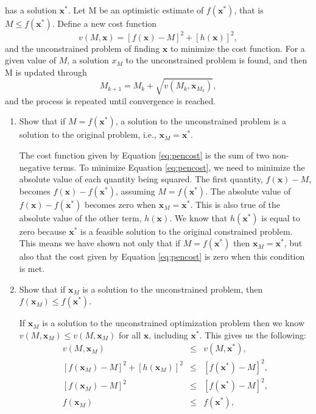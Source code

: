 \documentclass{article}
\begin{document}
has a solution $\mathbf{x}^*$.
Let M be an optimistic estimate of $f(\mathbf{x}^*)$, that is $M \le f(\mathbf{x}^*)$.
Define a new cost function
\begin{equation} \label{eq:pencost}
v(M,\mathbf{x}) = \left[f(\mathbf{x})-M\right]^2 + [h(\mathbf{x})]^2,
\end{equation}
and the unconstrained problem of finding $\mathbf{x}$ to minimize the cost function.
For a given value of $M$, a solution $x_M$ to the unconstrained problem is found, and then M is updated through
\begin{equation} \label{eq:penupdate}
M_{k+1} = M_k + \sqrt{v(M_k,\mathbf{x}_{M_k})},
\end{equation}
and the process is repeated until convergence is reached.

\begin{enumerate}
	\item \label{step:opt} Show that if $M=f(\mathbf{x}^*)$, a solution to the unconstrained problem is a solution to the original problem, i.e., $\mathbf{x}_M = \mathbf{x}^*$.
	
	The cost function given by Equation \ref{eq:pencost} is the sum of two non-negative terms.
	To minimize Equation \ref{eq:pencost}, we need to minimize the absolute value of each quantity being squared.
	The first quantity, $f(\mathbf{x}) - M$, becomes $f(\mathbf{x}) - f(\mathbf{x}^*)$, assuming $M = f(\mathbf{x}^*)$.
	The absolute value of $f(\mathbf{x}) - f(\mathbf{x}^*)$ becomes zero when $\mathbf{x}_M = \mathbf{x}^*$.
	This is also true of the absolute value of the other term, $h(\mathbf{x})$.
	We know that $h(\mathbf{x}^*)$ is equal to zero because $\mathbf{x}^*$ is a feasible solution to the original constrained problem.
	This means we have shown not only that if $M=f(\mathbf{x}^*)$ then $\mathbf{x}_M = \mathbf{x}^*$, but also that the cost given by Equation \ref{eq:pencost} is zero when this condition is met.
	
	\item \label{step:ineq} Show that if $\mathbf{x}_M$ is a solution to the unconstrained problem, then $f(\mathbf{x}_M) \le f(\mathbf{x}^*)$.
	
	If $\mathbf{x}_M$ is a solution to the unconstrained optimization problem then we know $v(M, \mathbf{x}_M) \le v(M, \mathbf{x}_M)$ for all $\mathbf{x}$, including $\mathbf{x}^*$.
	This gives us the following:
	\begin{eqnarray*}
		v(M, \mathbf{x}_M) &\le& v(M, \mathbf{x}^*),\\
		\left[f(\mathbf{x}_M)-M\right]^2 + \left[h(\mathbf{x}_M)\right]^2 &\le& \left[f(\mathbf{x}^*)-M\right]^2, \\
		\left[f(\mathbf{x}_M)-M\right]^2 &\le& \left[f(\mathbf{x}^*)-M\right]^2, \\
		f(\mathbf{x}_M) &\le& f(\mathbf{x}^*),
	\end{eqnarray*}
	

\end{enumerate}
\end{document}
